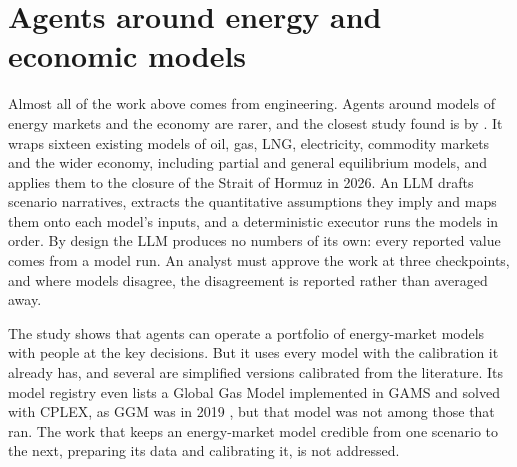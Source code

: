 \section{Agents around energy and economic models}

Almost all of the work above comes from engineering.
Agents around models of energy markets and the economy are rarer, and the closest study found is by \citet{golden2026agentic}.
It wraps sixteen existing models of oil, gas, LNG, electricity, commodity markets and the wider economy, including partial and general equilibrium models, and applies them to the closure of the Strait of Hormuz in 2026.
An LLM drafts scenario narratives, extracts the quantitative assumptions they imply and maps them onto each model's inputs, and a deterministic executor runs the models in order.
By design the LLM produces no numbers of its own: every reported value comes from a model run.
An analyst must approve the work at three checkpoints, and where models disagree, the disagreement is reported rather than averaged away.

The study shows that agents can operate a portfolio of energy-market models with people at the key decisions.
But it uses every model with the calibration it already has, and several are simplified versions calibrated from the literature.
Its model registry even lists a Global Gas Model implemented in GAMS and solved with CPLEX, as GGM was in 2019 \citep[p.~37]{egging2019global}, but that model was not among those that ran.
The work that keeps an energy-market model credible from one scenario to the next, preparing its data and calibrating it, is not addressed.

